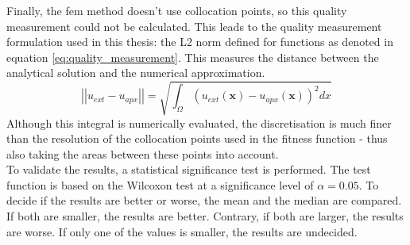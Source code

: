 \documentclass[./\jobname.tex]{subfiles}
\begin{document}
\begin{figure}[h]
	\centering
	\noindent{}
	\label{fig:aliasing error}
\end{figure}
Finally, the \gls{fem} method doesn't use collocation points, so this quality measurement could not be calculated. This leads to the quality measurement formulation used in this thesis: the L2 norm defined for functions as denoted in equation \eqref{eq:quality_measurement}. This measures the distance between the analytical solution and the numerical approximation.  
\begin{equation}
\label{eq:quality_measurement}
\left|\left|u_{ext} - u_{apx}\right|\right| = \sqrt{\int_{\Omega} (u_{ext}(\mathbf{x}) - u_{apx}(\mathbf{x}))^2 dx}
\end{equation}
\newpage
Although this integral is numerically evaluated, the discretisation is much finer than the resolution of the collocation points used in the fitness function - thus also taking the areas between these points into account.\\
To validate the results, a statistical significance test is performed. The test function is based on the Wilcoxon test at a significance level of $\alpha = 0.05$. To decide if the results are better or worse, the mean and the median are compared. If both are smaller, the results are better. Contrary, if both are larger, the results are worse. If only one of the values is smaller, the results are undecided. 
\end{document}
